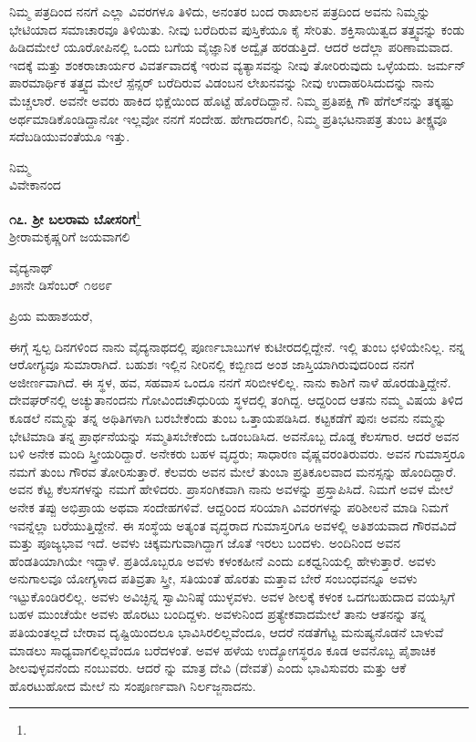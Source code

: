 ನಿಮ್ಮ ಪತ್ರದಿಂದ ನನಗೆ ಎಲ್ಲಾ ವಿವರಗಳೂ ತಿಳಿದು, ಅನಂತರ ಬಂದ ರಾಖಾಲನ ಪತ್ರದಿಂದ ಅವನು ನಿಮ್ಮನ್ನು ಭೇಟಿಯಾದ ಸಮಾಚಾರವೂ ತಿಳಿಯಿತು. ನೀವು ಬರೆದಿರುವ ಪುಸ್ತಿಕೆಯೂ ಕೈ ಸೇರಿತು. ಶಕ್ತಿಸಾಯಿತ್ವದ ತತ್ತ್ವವನ್ನು ಕಂಡು ಹಿಡಿದಮೇಲೆ ಯೂರೋಪಿನಲ್ಲಿ ಒಂದು ಬಗೆಯ ವೈಜ್ಞಾನಿಕ ಅದ್ವೈತ ಹರಡುತ್ತಿದೆ. ಆದರೆ ಅದೆಲ್ಲಾ ಪರಿಣಾಮವಾದ. ಇದಕ್ಕೆ ಮತ್ತು ಶಂಕರಾಚಾರ್ಯರ ವಿವರ್ತವಾದಕ್ಕೆ ಇರುವ ವ್ಯತ್ಯಾಸವನ್ನು ನೀವು ತೋರಿರುವುದು ಒಳ್ಳೆಯದು. ಜರ್ಮನ್ ಪಾರಮಾರ್ಥಿಕ ತತ್ತ್ವದ ಮೇಲೆ ಸ್ಪೆನ್ಸರ್ ಬರೆದಿರುವ ವಿಡಂಬನ ಲೇಖನವನ್ನು ನೀವು ಉದಾಹರಿಸಿದುದನ್ನು ನಾನು ಮೆಚ್ಚಲಾರೆ. ಅವನೇ ಅವರು ಹಾಕಿದ ಭಿಕ್ಷೆಯಿಂದ ಹೊಟ್ಟೆ ಹೊರೆದಿದ್ದಾನೆ. ನಿಮ್ಮ ಪ್ರತಿಪಕ್ಷಿ ಗೌ  ಹೆಗೆಲ್‌ನನ್ನು ತಕ್ಕಷ್ಟು ಅರ್ಥಮಾಡಿಕೊಂಡಿದ್ದಾನೋ ಇಲ್ಲವೋ ನನಗೆ ಸಂದೇಹ. ಹೇಗಾದರಾಗಲಿ, ನಿಮ್ಮ ಪ್ರತಿಭಟನಾಪತ್ರ ತುಂಬ ತೀಕ್ಷ್ಣವೂ ಸದೆಬಡಿಯುವಂತೆಯೂ ಇತ್ತು.

{\flushright
ನಿಮ್ಮ\\ವಿವೇಕಾನಂದ\par}

\newpage
\begin{center}
\textbf{೧೭. ಶ‍್ರೀ ಬಲರಾಮ ಬೋಸರಿಗೆ}\footnote{}\\ ಶ‍್ರೀರಾಮಕೃಷ್ಣರಿಗೆ ಜಯವಾಗಲಿ
\end{center}

\begin{flushright}
ವೈದ್ಯನಾಥ್\\೨೫ನೇ ಡಿಸೆಂಬರ್‌ ೧೮೮೯
\end{flushright}

\noindent
ಪ್ರಿಯ ಮಹಾಶಯರೆ,

ಈಗ್ಗೆ ಸ್ವಲ್ಪ ದಿನಗಳಿಂದ ನಾನು ವೈದ್ಯನಾಥದಲ್ಲಿ ಪೂರ್ಣಬಾಬುಗಳ ಕುಟೀರದಲ್ಲಿದ್ದೇನೆ. ಇಲ್ಲಿ ತುಂಬ ಛಳಿಯೇನಿಲ್ಲ. ನನ್ನ ಆರೋಗ್ಯವೂ ಸುಮಾರಾಗಿದೆ. ಬಹುಶಃ ಇಲ್ಲಿನ ನೀರಿನಲ್ಲಿ ಕಬ್ಬಿಣದ ಅಂಶ ಜಾಸ್ತಿಯಾಗಿರುವುದರಿಂದ ನನಗೆ ಅಜೀರ್ಣವಾಗಿದೆ. ಈ ಸ್ಥಳ, ಹವ, ಸಹವಾಸ ಒಂದೂ ನನಗೆ ಸರಿಬೀಳಲಿಲ್ಲ. ನಾನು ಕಾಶಿಗೆ ನಾಳೆ ಹೊರಡುತ್ತಿದ್ದೇನೆ. ದೇವಘರ್‌ನಲ್ಲಿ ಅಚ್ಯುತಾನಂದನು ಗೋವಿಂದಚೌಧುರಿಯ ಸ್ಥಳದಲ್ಲಿ ತಂಗಿದ್ದ. ಆದ್ದರಿಂದ ಆತನು ನಮ್ಮ ವಿಷಯ ತಿಳಿದ ಕೂಡಲೆ ನಮ್ಮನ್ನು ತನ್ನ ಅಥಿತಿಗಳಾಗಿ ಬರಬೇಕೆಂದು ತುಂಬ ಒತ್ತಾಯಪಡಿಸಿದ. ಕಟ್ಟಕಡೆಗೆ ಪುನಃ ಅವನು ನಮ್ಮನ್ನು ಭೇಟಿಮಾಡಿ ತನ್ನ ಪ್ರಾರ್ಥನೆಯನ್ನು ಸಮ್ಮತಿಸಬೇಕೆಂದು ಒಡಂಬಡಿಸಿದ. ಅವನೊಬ್ಬ ದೊಡ್ಡ ಕೆಲಸಗಾರ. ಆದರೆ ಅವನ ಬಳಿ ಅನೇಕ ಮಂದಿ ಸ್ತ್ರೀಯರಿದ್ದಾರೆ. ಅನೇಕರು ಬಹಳ ವೃದ್ಧರು; ಸಾಧಾರಣ ವೈಷ್ಣವರಂತಿರುವರು. ಅವನ ಗುಮಾಸ್ತರೂ ನಮಗೆ ತುಂಬ ಗೌರವ ತೋರಿಸುತ್ತಾರೆ. ಕೆಲವರು ಅವನ ಮೇಲೆ ತುಂಬಾ ಪ್ರತಿಕೂಲವಾದ ಮನಸ್ಸನ್ನು ಹೊಂದಿದ್ದಾರೆ. ಅವನ ಕೆಟ್ಟ ಕೆಲಸಗಳನ್ನು ನಮಗೆ ಹೇಳಿದರು. ಪ್ರಾಸಂಗಿಕವಾಗಿ ನಾನು \enginline{-} ಅವಳನ್ನು ಪ್ರಸ್ತಾಪಿಸಿದೆ. ನಿಮಗೆ ಅವಳ ಮೇಲೆ ಅನೇಕ ತಪ್ಪು ಅಭಿಪ್ರಾಯ ಅಥವಾ ಸಂದೇಹಗಳಿವೆ. ಆದ್ದರಿಂದ ಸರಿಯಾಗಿ ವಿವರಗಳನ್ನು ಪರಿಶೀಲನೆ ಮಾಡಿ ನಿಮಗೆ ಇವನ್ನೆಲ್ಲಾ ಬರೆಯುತ್ತಿದ್ದೇನೆ. ಈ ಸಂಸ್ಥೆಯ ಅತ್ಯಂತ ವೃದ್ಧರಾದ ಗುಮಾಸ್ತರಿಗೂ ಅವಳಲ್ಲಿ ಅತಿಶಯವಾದ ಗೌರವವಿದೆ ಮತ್ತು ಪೂಜ್ಯಭಾವ ಇದೆ. ಅವಳು ಚಿಕ್ಕಮಗುವಾಗಿದ್ದಾಗ \enginline{-} ಜೊತೆ ಇರಲು ಬಂದಳು. ಅಂದಿನಿಂದ ಅವನ ಹೆಂಡತಿಯಾಗಿಯೇ ಇದ್ದಾಳೆ. ಪ್ರತಿಯೊಬ್ಬರೂ ಅವಳು ಕಳಂಕಹೀನೆ ಎಂದು ಏಕಧ್ವನಿಯಲ್ಲಿ ಹೇಳುತ್ತಾರೆ. ಅವಳು ಅನುಗಾಲವೂ ಯೋಗ್ಯಳಾದ ಪತಿವ್ರತಾ ಸ್ತ್ರೀ, ಸತಿಯಂತೆ ಹೊರತು ಮತ್ತಾವ ಬೇರೆ ಸಂಬಂಧವನ್ನೂ ಅವಳು ಇಟ್ಟುಕೊಂಡಿರಲಿಲ್ಲ. ಅವಳು ಅವಿಚ್ಛಿನ್ನ ಸ್ವಾಮಿನಿಷ್ಠೆ ಯುಳ್ಳವಳು. ಅವಳ ಶೀಲಕ್ಕೆ ಕಳಂಕ ಒದಗಬಹುದಾದ ವಯಸ್ಸಿಗೆ ಬಹಳ ಮುಂಚೆಯೇ ಅವಳು ಹೊರಟು ಬಂದಿದ್ದಳು. ಅವಳು\enginline{-}ನಿಂದ ಪ್ರತ್ಯೇಕವಾದಮೇಲೆ ತಾನು ಆತನನ್ನು ತನ್ನ ಪತಿಯಂತಲ್ಲದೆ ಬೇರಾವ ದೃಷ್ಟಿಯಿಂದಲೂ ಭಾವಿಸಿರಲಿಲ್ಲವೆಂದೂ, ಆದರೆ ನಡತೆಗೆಟ್ಟ ಮನುಷ್ಯನೊಡನೆ ಬಾಳುವೆ ಮಾಡಲು ಸಾಧ್ಯವಾಗಲಿಲ್ಲವೆಂದೂ ಬರೆದಳಂತೆ. ಅವಳ ಹಳೆಯ ಉದ್ಯೋಗಸ್ಥರೂ ಕೂಡ ಅವನೊಬ್ಬ ಪೈಶಾಚಿಕ ಶೀಲವುಳ್ಳವನೆಂದು ನಂಬುವರು. ಆದರೆ \enginline{-} ನ್ನು ಮಾತ್ರ ದೇವಿ (ದೇವತೆ) ಎಂದು ಭಾವಿಸುವರು ಮತ್ತು ಆಕೆ ಹೊರಟುಹೋದ ಮೇಲೆ \enginline{-} ನು ಸಂಪೂರ್ಣವಾಗಿ ನಿರ್ಲಜ್ಜನಾದನು.


